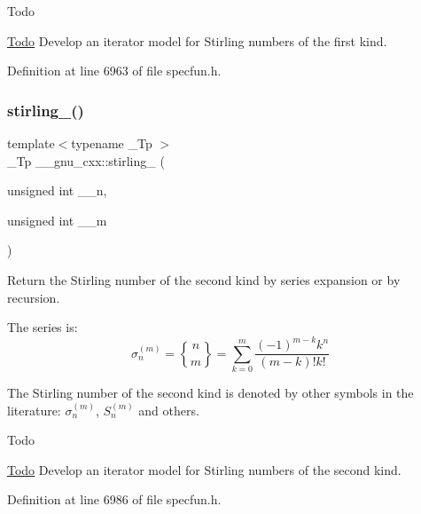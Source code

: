 \begin{DoxyRefDesc}{Todo}
\item[\hyperlink{todo__todo000004}{Todo}]Develop an iterator model for Stirling numbers of the first kind. \end{DoxyRefDesc}


Definition at line 6963 of file specfun.\+h.

\mbox{\label{group__gnu__math__spec__func_ga3761c0e467cbe45cbda66a4e796adcd3}} 
\subsubsection{\texorpdfstring{stirling\+\_()}{stirling\_2()}}
{\footnotesize\ttfamily template$<$typename \+\_\+\+Tp $>$ \\
\+\_\+\+Tp \+\_\+\+\_\+gnu\+\_\+cxx\+::stirling\+\_ (\begin{DoxyParamCaption}\item[{unsigned int}]{\+\_\+\+\_\+n,  }\item[{unsigned int}]{\+\_\+\+\_\+m }\end{DoxyParamCaption})\hspace{0.3cm}{\ttfamily [inline]}}

Return the Stirling number of the second kind by series expansion or by recursion.

The series is\+: \[ \newcommand{\stirling}[2]{\genfrac{\{}{\}}{0pt}{0}{#1}{#2}} \sigma_n^{(m)} = \stirling{n}{m} = \sum_{k=0}^{m}\frac{(-1)^{m-k}k^n}{(m-k)!k!} \]

The Stirling number of the second kind is denoted by other symbols in the literature\+: $ \sigma_n^{(m)} $, $ \textit{S}_n^{(m)} $ and others.

\begin{DoxyRefDesc}{Todo}
\item[\hyperlink{todo__todo000005}{Todo}]Develop an iterator model for Stirling numbers of the second kind. \end{DoxyRefDesc}


Definition at line 6986 of file specfun.\+h.

\mbox{\label{group__gnu__math__spec__func_ga5a84386b009ac57a726d5d0314fdf7ce}} 
